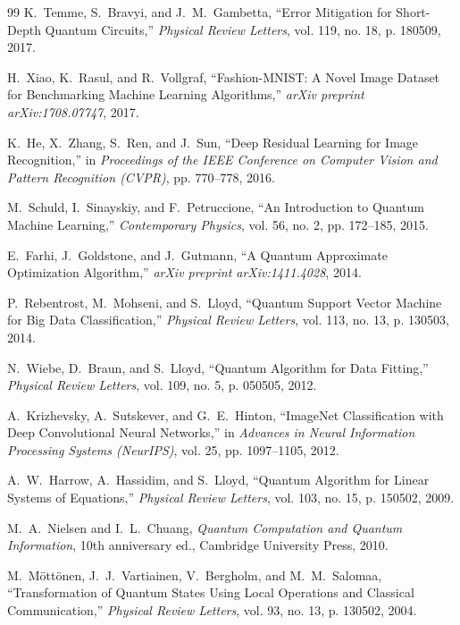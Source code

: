 \documentclass[pdflatex,sn-mathphys-num]{sn-jnl}%
\theoremstyle{thmstyleone}%
\theoremstyle{thmstyletwo}%
\theoremstyle{thmstylethree}%
\begin{document}
\begin{thebibliography}{99}
K.~Temme, S.~Bravyi, and J.~M.~Gambetta,
``Error Mitigation for Short-Depth Quantum Circuits,''
\emph{Physical Review Letters}, vol. 119, no. 18,
p. 180509, 2017.

H.~Xiao, K.~Rasul, and R.~Vollgraf,
``Fashion-MNIST: A Novel Image Dataset for Benchmarking Machine Learning Algorithms,''
\emph{arXiv preprint arXiv:1708.07747}, 2017.

K.~He, X.~Zhang, S.~Ren, and J.~Sun,
``Deep Residual Learning for Image Recognition,''
in \emph{Proceedings of the IEEE Conference on Computer Vision and Pattern Recognition (CVPR)},
pp. 770--778, 2016.

M.~Schuld, I.~Sinayskiy, and F.~Petruccione,
``An Introduction to Quantum Machine Learning,''
\emph{Contemporary Physics}, vol. 56, no. 2,
pp. 172--185, 2015.

E.~Farhi, J.~Goldstone, and J.~Gutmann,
``A Quantum Approximate Optimization Algorithm,''
\emph{arXiv preprint arXiv:1411.4028}, 2014.

P.~Rebentrost, M.~Mohseni, and S.~Lloyd,
``Quantum Support Vector Machine for Big Data Classification,''
\emph{Physical Review Letters}, vol. 113, no. 13,
p. 130503, 2014.

N.~Wiebe, D.~Braun, and S.~Lloyd,
``Quantum Algorithm for Data Fitting,''
\emph{Physical Review Letters}, vol. 109, no. 5,
p. 050505, 2012.

A.~Krizhevsky, A.~Sutskever, and G.~E.~Hinton,
``ImageNet Classification with Deep Convolutional Neural Networks,''
in \emph{Advances in Neural Information Processing Systems (NeurIPS)},
vol. 25, pp. 1097--1105, 2012.

A.~W.~Harrow, A.~Hassidim, and S.~Lloyd,
``Quantum Algorithm for Linear Systems of Equations,''
\emph{Physical Review Letters}, vol. 103, no. 15,
p. 150502, 2009.

M.~A.~Nielsen and I.~L.~Chuang,
\emph{Quantum Computation and Quantum Information},
10th anniversary ed., Cambridge University Press, 2010.

M.~M{\"o}tt{\"o}nen, J.~J.~Vartiainen, V.~Bergholm,
and M.~M.~Salomaa,
``Transformation of Quantum States Using Local Operations and Classical Communication,''
\emph{Physical Review Letters}, vol. 93, no. 13,
p. 130502, 2004.


\end{thebibliography}
\end{document}
